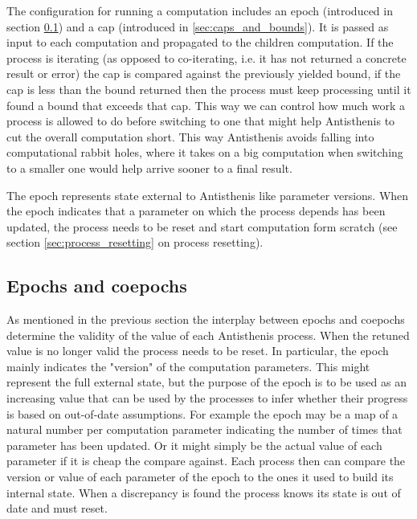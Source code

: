 The configuration for running a computation includes an epoch
(introduced in section \ref{sec:epochs_coepochs}) and a cap
(introduced in \ref{sec:caps_and_bounds}). It is passed as input to
each computation and propagated to the children computation. If the
process is iterating (as opposed to co-iterating, i.e. it has not
returned a concrete result or error) the cap is compared against the
previously yielded bound, if the cap is less than the bound returned
then the process must keep processing until it found a bound that
exceeds that cap. This way we can control how much work a process is
allowed to do before switching to one that might help Antisthenis to
cut the overall computation short. This way Antisthenis avoids falling
into computational rabbit holes, where it takes on a big computation
when switching to a smaller one would help arrive sooner to a final
result.

The epoch represents state external to Antisthenis like parameter
versions. When the epoch indicates that a parameter on which the
process depends has been updated, the process needs to be reset and
start computation form scratch (see section
\ref{sec:process_resetting} on process resetting).


\subsection{Epochs and coepochs}
\label{sec:epochs_coepochs}

As mentioned in the previous section the interplay between epochs and
coepochs determine the validity of the value of each Antisthenis
process. When the retuned value is no longer valid the process needs
to be reset. In particular, the epoch mainly indicates the "version"
of the computation parameters. This might represent the full external
state, but the purpose of the epoch is to be used as an increasing
value that can be used by the processes to infer whether their
progress is based on out-of-date assumptions. For example the epoch
may be a map of a natural number per computation parameter indicating
the number of times that parameter has been updated. Or it might
simply be the actual value of each parameter if it is cheap the
compare against. Each process then can compare the version or value of
each parameter of the epoch to the ones it used to build its internal
state. When a discrepancy is found the process knows its state is out
of date and must reset.

